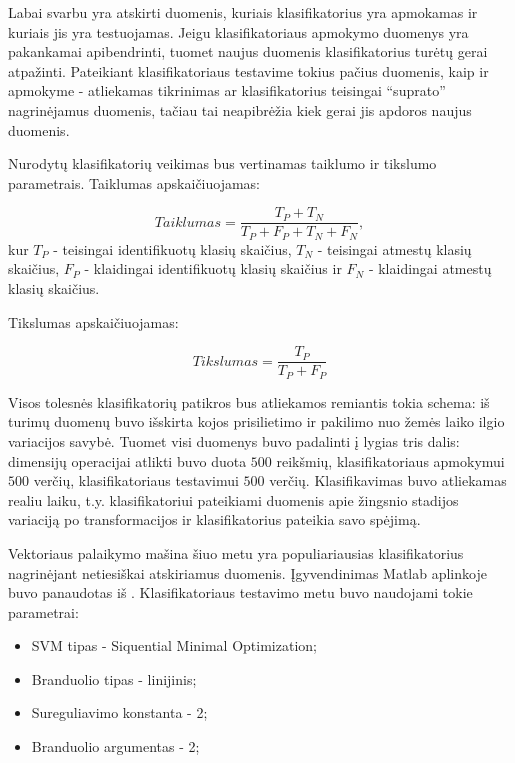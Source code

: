 \documentclass[]{vgtuef}
\begin{document}
Labai svarbu yra atskirti duomenis, kuriais klasifikatorius yra apmokamas ir kuriais jis yra testuojamas. Jeigu klasifikatoriaus apmokymo duomenys yra pakankamai apibendrinti, tuomet naujus duomenis klasifikatorius turėtų gerai atpažinti. Pateikiant klasifikatoriaus testavime tokius pačius duomenis, kaip ir apmokyme - atliekamas tikrinimas ar klasifikatorius teisingai ``suprato'' nagrinėjamus duomenis, tačiau tai neapibrėžia kiek gerai jis apdoros naujus duomenis.

Nurodytų klasifikatorių veikimas bus vertinamas taiklumo ir tikslumo parametrais. Taiklumas apskaičiuojamas:

\begin{equation}
Taiklumas = \frac{T_P + T_N}{T_P + F_P + T_N + F_N},
\end{equation}
kur $T_P$ - teisingai identifikuotų klasių skaičius, $T_N$ - teisingai atmestų klasių skaičius, $F_P$ - klaidingai identifikuotų klasių skaičius ir $F_N$ - klaidingai atmestų klasių skaičius.

Tikslumas apskaičiuojamas:

\begin{equation}
Tikslumas = \frac{T_P}{T_P + F_P}
\end{equation}

Visos tolesnės klasifikatorių patikros bus atliekamos remiantis tokia schema: iš turimų duomenų buvo išskirta kojos prisilietimo ir pakilimo nuo žemės laiko ilgio variacijos savybė. Tuomet visi duomenys buvo padalinti į lygias tris dalis: dimensijų operacijai atlikti buvo duota $500$ reikšmių, klasifikatoriaus apmokymui $500$ verčių, klasifikatoriaus testavimui $500$ verčių. Klasifikavimas buvo atliekamas realiu laiku, t.y. klasifikatoriui pateikiami duomenis apie žingsnio stadijos variaciją po transformacijos ir klasifikatorius pateikia savo spėjimą.

Vektoriaus palaikymo mašina \cite{Burges98atutorial} šiuo metu yra populiariausias klasifikatorius nagrinėjant netiesiškai atskiriamus duomenis. Įgyvendinimas Matlab aplinkoje buvo panaudotas iš \cite{website:svm_implementation}. Klasifikatoriaus testavimo metu buvo naudojami tokie parametrai:

\begin{itemize}
\item SVM tipas - Siquential Minimal Optimization;
\item Branduolio tipas - linijinis;
\item Sureguliavimo konstanta - 2;
\item Branduolio argumentas - 2;
\end{itemize}
\end{document}
